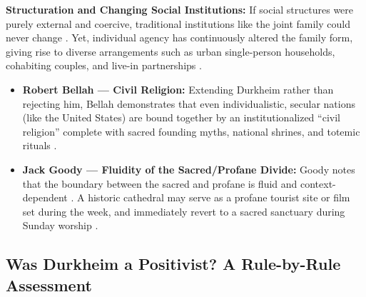 \begin{KeyConcept}
\textbf{Structuration and Changing Social Institutions:}
If social structures were purely external and coercive, traditional institutions like the joint family could never change . Yet, individual agency has continuously altered the family form, giving rise to diverse arrangements such as urban single-person households, cohabiting couples, and live-in partnerships .
\end{KeyConcept}

\begin{itemize}
    \item \textbf{Robert Bellah --- Civil Religion:} Extending Durkheim rather than rejecting him, Bellah demonstrates that even individualistic, secular nations (like the United States) are bound together by an institutionalized ``civil religion'' complete with sacred founding myths, national shrines, and totemic rituals .
    \item \textbf{Jack Goody --- Fluidity of the Sacred/Profane Divide:}
    Goody notes that the boundary between the sacred and profane is fluid and context-dependent . A historic cathedral may serve as a profane tourist site or film set during the week, and immediately revert to a sacred sanctuary during Sunday worship .
\end{itemize}

\subsection{Was Durkheim a Positivist? A Rule-by-Rule Assessment}

